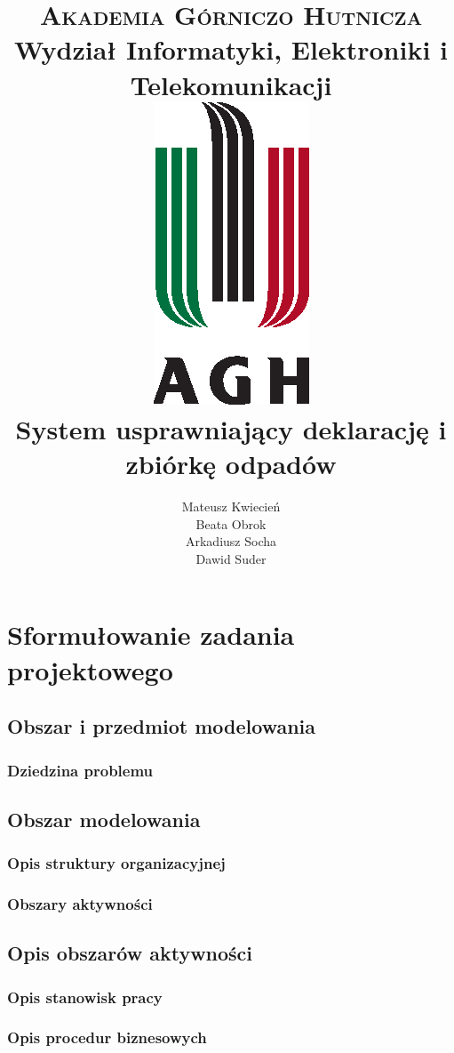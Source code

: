 \documentclass[paper=a4, fontsize=12pt]{scrartcl}
\title{
		\usefont{OT1}{bch}{b}{n}
		\normalfont \normalsize \textsc{Akademia Górniczo Hutnicza} \\ [25pt]
		Wydział Informatyki, Elektroniki i Telekomunikacji
		\horrule{0.5pt} \\[1cm]
		\includegraphics[width=.35\textwidth]{img/agh_znk_wbr_cmyk.eps} \\[1.5cm]
		\huge System usprawniający deklarację i zbiórkę odpadów
		\horrule{0.5pt} \\[0cm]
}
\author{
		\normalfont \normalsize
        Mateusz Kwiecień\\[-3pt]	\normalsize
        Beata Obrok\\[-3pt]			\normalsize
        Arkadiusz Socha\\[-3pt]		\normalsize
        Dawid Suder\\[-3pt]			\normalsize
}
\date{}
\numberwithin{equation}{section}		%
\numberwithin{figure}{section}			%
\numberwithin{table}{section}				%
\begin{document}
\maketitle
\tableofcontents
\clearpage

\section{Sformułowanie zadania projektowego}

	\subsection{Obszar i przedmiot modelowania}

		\subsubsection{Dziedzina problemu}
			

	\subsection{Obszar modelowania}

		\subsubsection{Opis struktury organizacyjnej}
			

		\subsubsection{Obszary aktywności}
			

	\subsection{Opis obszarów aktywności}

		\subsubsection{Opis stanowisk pracy}
			

		\subsubsection{Opis procedur biznesowych}
			
\end{document}
